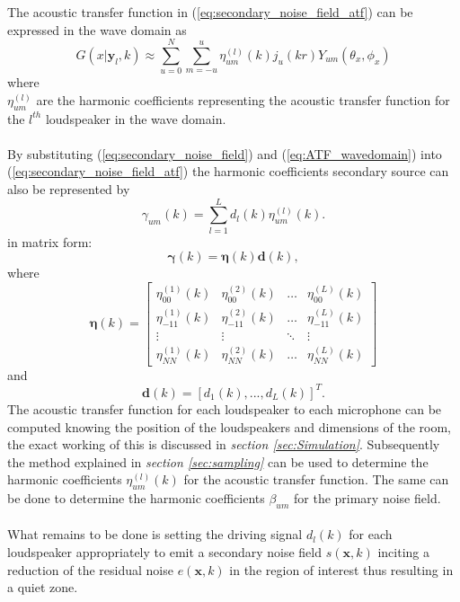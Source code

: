 The acoustic transfer function in (\ref{eq:secondary_noise_field_atf}) can be expressed in the wave domain as \cite{Betlehem2005}
\begin{equation}
    G(x|\mathbf{y}_l,k) \approx \sum_{u=0}^N \sum_{m=-u}^u\eta^{(l)}_{um}(k)j_u(kr)Y_{um}(\theta_x,\phi_x)
    \label{eq:ATF_wavedomain}
\end{equation}
where\\
$\eta^{(l)}_{um}$ are the harmonic coefficients representing the acoustic transfer function for the $l^{th}$ loudspeaker in the wave domain.\\\\
By substituting (\ref{eq:secondary_noise_field}) and (\ref{eq:ATF_wavedomain}) into (\ref{eq:secondary_noise_field_atf}) the harmonic coefficients secondary source can also be represented by
\begin{equation}
    \gamma_{um}(k) = \sum_{l=1}^Ld_l(k)\eta_{um}^{(l)}(k).
\end{equation}
in matrix form:
\begin{equation}
    {\boldsymbol{\gamma}}(k)=\boldsymbol{\eta}(k) \mathbf{d}(k),
\end{equation}
where\\
\begin{equation}
    \boldsymbol{\eta}(k) = 
    \begin{bmatrix}
        \eta_{00}^{(1)}(k) & \eta_{00}^{(2)}(k) & \hdots & \eta_{00}^{(L)}(k)\\
        \eta_{-11}^{(1)}(k) & \eta_{-11}^{(2)}(k) & \hdots & \eta_{-11}^{(L)}(k)\\
        \vdots & \vdots & \ddots & \vdots\\
        \eta_{NN}^{(1)}(k) & \eta_{NN}^{(2)}(k) & \hdots & \eta_{NN}^{(L)}(k)
    \end{bmatrix}
    \label{eq:secondary_coef_vector}
\end{equation}
and\\
\begin{equation}
    \boldsymbol{d}(k) = [d_1(k),...,d_L(k)]^T.
\end{equation}
The acoustic transfer function for each loudspeaker to each microphone can be computed knowing the position of the loudspeakers and dimensions of the room, the exact working of this is discussed in \textit{section \ref{sec:Simulation}}. Subsequently the method explained in \textit{section \ref{sec:sampling}} can be used to determine the harmonic coefficients $\eta^{(l)}_{um}(k)$ for the acoustic transfer function. The same can be done to determine the harmonic coefficients $\beta_{um}$ for the primary noise field.\\\\
What remains to be done is setting the driving signal $d_l(k)$ for each loudspeaker appropriately to emit a secondary noise field $s(\mathbf{x},k)$ inciting a reduction of the residual noise $e(\mathbf{x},k)$ in the region of interest thus resulting in a quiet zone.



